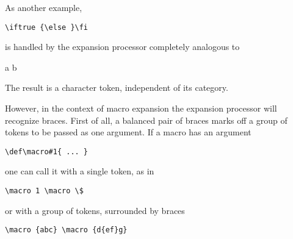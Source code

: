 \documentclass{book}
\begin{document}
As another example, \begin{verbatim}
\iftrue {\else }\fi
\end{verbatim}
is handled by the expansion processor 
completely analogous to
\begin{disp} {\italic a} {\italic b}\end{disp}
The result is a character token, independent of its category.

However, in the context of macro expansion 
the expansion  processor will 
recognize braces. 
First of all, a balanced pair of braces marks off a group of tokens
to be passed as one argument.
If a macro has an argument \begin{verbatim}
\def\macro#1{ ... }
\end{verbatim}
one can call it with a single token, as in
\begin{verbatim}
\macro 1 \macro \$
\end{verbatim}
or with a group of tokens, surrounded by braces
\begin{verbatim}
\macro {abc} \macro {d{ef}g}
\end{verbatim}
\end{document}
